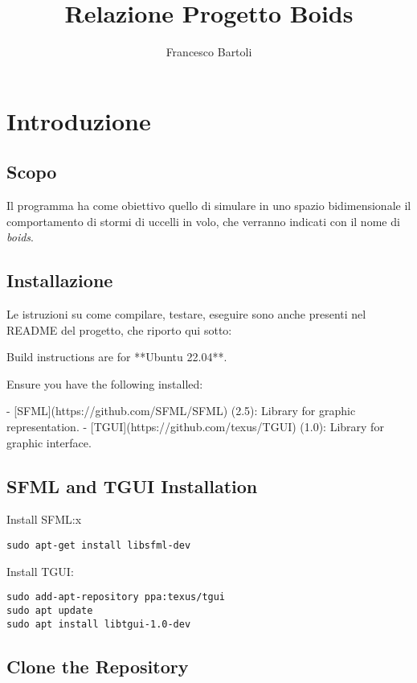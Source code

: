 \documentclass[12pt,a4paper]{article}
\title{Relazione Progetto Boids}
\author{Francesco Bartoli}
\date{}
\begin{document}
\setlength{\parindent}{0pt}

\maketitle

\section{Introduzione}
\subsection{Scopo}
Il programma ha come obiettivo quello di simulare in uno spazio bidimensionale il comportamento di stormi di uccelli in volo, che verranno indicati con il nome di \textit{boids}. 

\subsection{Installazione}

Le istruzioni su come compilare, testare, eseguire sono anche presenti nel README del progetto, che riporto qui sotto:

Build instructions are for **Ubuntu 22.04**.

Ensure you have the following installed:

- [SFML](https://github.com/SFML/SFML) (2.5): Library for graphic representation.
- [TGUI](https://github.com/texus/TGUI) (1.0): Library for graphic interface.

\subsection{SFML and TGUI Installation}

Install SFML:x

\begin{lstlisting}
sudo apt-get install libsfml-dev
\end{lstlisting}

Install TGUI:

\begin{lstlisting}
sudo add-apt-repository ppa:texus/tgui
sudo apt update
sudo apt install libtgui-1.0-dev
\end{lstlisting}

\subsection{Clone the Repository}
\end{document}
